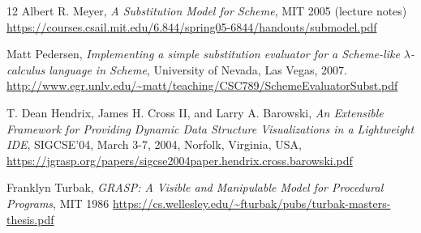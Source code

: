 \documentclass[acmsmall,nonacm]{acmart}
\begin{document}
\begin{thebibliography}{12}
 Albert R. Meyer, \emph{A Substitution Model for Scheme},
  MIT 2005 (lecture notes) \\
  \url{https://courses.csail.mit.edu/6.844/spring05-6844/handouts/submodel.pdf}
  
 Matt Pedersen, \emph{Implementing a simple
substitution evaluator for a Scheme-like $\lambda$-calculus language
in Scheme}, University of Nevada, Las Vegas, 2007. \\
  \url{http://www.egr.unlv.edu/~matt/teaching/CSC789/SchemeEvaluatorSubst.pdf}
  
 T. Dean Hendrix, James H. Cross II, and Larry
  A. Barowski, \emph{An Extensible Framework for Providing Dynamic
  Data Structure Visualizations in a Lightweight IDE},  SIGCSE'04,
  March 3-7, 2004, Norfolk, Virginia, USA,
  \url{https://jgrasp.org/papers/sigcse2004paper.hendrix.cross.barowski.pdf}
  
 Franklyn Turbak, \emph{GRASP: A Visible and
Manipulable Model for Procedural Programs}, MIT 1986
  \url{https://cs.wellesley.edu/~fturbak/pubs/turbak-masters-thesis.pdf}

\end{thebibliography}
\end{document}
